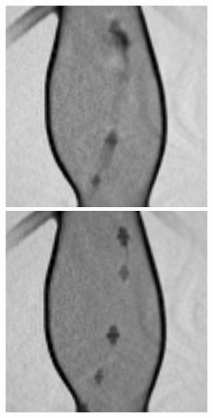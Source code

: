 \documentclass[conference]{IEEEtran}
\begin{document}
\begin{figure}[ht]
    \centering
    \begin{minipage}{0.241\textwidth}
        \centering
        \includegraphics[width=\textwidth]{Conference/img/flow-artifact-with.jpg}
    \end{minipage}\hfill \hspace*{0cm}
    \begin{minipage}{0.241\textwidth}
        \centering
        \includegraphics[width=\textwidth]{Conference/img/flow-artifact-without.jpg}

\end{minipage}
\end{figure}
\end{document}
